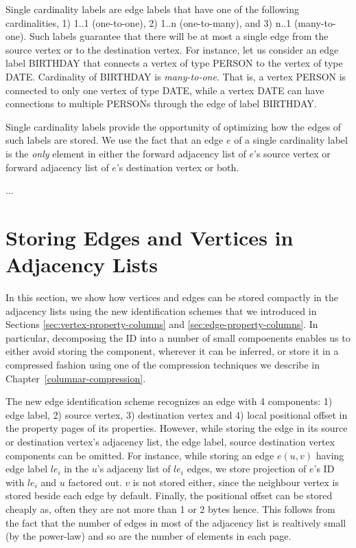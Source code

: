Single cardinality labels are edge labels that have one of the following cardinalities, 1) 1..1 (one-to-one), 2) 1..n (one-to-many), and 3) n..1 (many-to-one). Such labels guarantee that there will be at most a single edge from the source vertex or to the destination vertex. For instance, let us consider an edge label BIRTHDAY that connects a vertex of type PERSON to the vertex of type DATE. Cardinality of BIRTHDAY is \emph{many-to-one}. That is, a vertex PERSON is connected to only one vertex of type DATE, while a vertex DATE can have connections to multiple PERSONs through the edge of label BIRTHDAY.

Single cardinality labels provide the opportunity of optimizing how the edges of such labels are stored. We use the fact that an edge $e$ of a single cardinality label is the \emph{only} element in either the forward adjacency list of $e$'s source vertex or forward adjacency list of $e$'s destination vertex or both. 

...

\section{Storing Edges and Vertices in Adjacency Lists}
\label{sec:storage-optimizations}

In this section, we show how vertices and edges can be stored compactly in the adjacency lists using the new identification schemes that we introduced in Sections \ref{sec:vertex-property-columns} and \ref{sec:edge-property-columns}. In particular, decomposing the ID into a number of small compoenents enables us to either avoid storing the component, wherever it can be inferred, or store it in a compressed fashion using one of the compression techniques we describe in Chapter~\ref{columnar-compression}.

The new edge identification scheme recognizes an edge with 4 components: 1) edge label, 2) source vertex, 3) destination vertex and 4) local positional offset in the property pages of its properties. However, while storing the edge in its source or destination vertex's adjacency list, the edge label, source destination vertex components can be omitted. For instance, while storing an edge $e(u,v)$ having edge label $le_i$ in the $u$'s adjaceny list of $le_i$ edges, we store projection of $e$'s ID with $le_i$ and $u$ factored out. $v$ is not stored either, since the neighbour vertex is stored beside each edge by default. Finally, the positional offset can be stored cheaply as, often they are not more than 1 or 2 bytes hence. This follows from the fact that the number of edges in most of the adjacency list is realtively small (by the power-law) and so are the number of elements in each page. 

